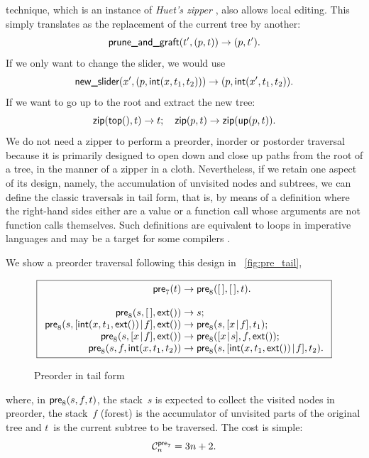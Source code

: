 technique, which is an instance of \emph{Huet's zipper}
\citep{Huet_1997,Huet_2003}, also allows local editing. This simply
translates as the replacement of the current tree by another:
\begin{equation*}
\fun{prune\_and\_graft}(t',\pair{p}{t}) \rightarrow \pair{p}{t'}.
\end{equation*}
If we only want to change the slider, we would use
\begin{equation*}
\fun{new\_slider}(x',\pair{p}{\fun{int}(x,t_1,t_2)}) \rightarrow
\pair{p}{\fun{int}(x',t_1,t_2)}.
\end{equation*}
If we want to go up to the root and extract the new tree:
\begin{equation*}
\fun{zip}(\fun{top}(), t) \rightarrow t;\quad
\fun{zip}(p, t) \rightarrow \fun{zip}(\fun{up}(p, t)).
\end{equation*}
We do not need a zipper to perform a
preorder, inorder or postorder traversal because it is primarily
designed to open down and close up paths from the root of a tree, in
the manner of a zipper in a
cloth. Nevertheless, if we retain one aspect of its design, namely,
the accumulation of unvisited nodes and subtrees, we can define the
classic traversals in tail form,
that is, by means of a definition where the right\hyp{}hand sides
either are a value or a function call whose arguments are not function
calls themselves. Such definitions are equivalent to loops in
imperative languages and may be a target for some compilers
\citep{Appel_1992}.

We show a preorder traversal following this design in
\fig~\vref{fig:pre_tail},
\begin{figure}[t]
\begin{equation*}
\boxed{
\begin{array}{r@{\;}c@{\;}l}
\fun{pre}_7(t) & \rightarrow & \fun{pre}_8(\el,\el,t).\\
\\
\fun{pre}_8(s,\el,\fun{ext}()) & \rightarrow & s;\\
\fun{pre}_8(s,\cons{\fun{int}(x,t_1,\fun{ext}())}{f},\fun{ext}()) &
\rightarrow & \fun{pre}_8(s,\cons{x}{f},t_1);\\
\fun{pre}_8(s,\cons{x}{f},\fun{ext}()) & \rightarrow &
\fun{pre}_8(\cons{x}{s},f,\fun{ext}());\\
\fun{pre}_8(s,f,\fun{int}(x,t_1,t_2)) & \rightarrow &
\fun{pre}_8(s,\cons{\fun{int}(x,t_1,\fun{ext}())}{f},t_2).
\end{array}}
\end{equation*}
\caption{Preorder in tail form}
\label{fig:pre_tail}
\end{figure}
where, in \(\fun{pre}_8(s,f,t)\), the stack~\(s\) is expected to
collect the visited nodes in preorder, the stack~\(f\) (forest) is the
accumulator of unvisited parts of the original tree and \(t\)~is the
current subtree to be traversed. The cost is simple:
\begin{equation*}
  \C{\fun{pre}_7}{n} = 3n + 2.
\end{equation*}


